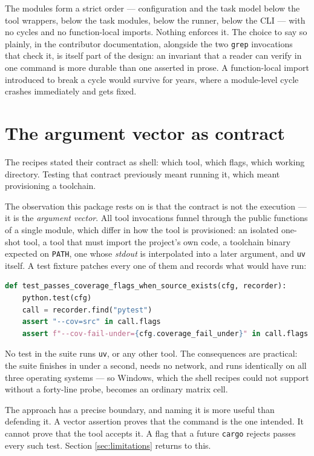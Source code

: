 \documentclass[11pt,a4paper]{article}
\begin{document}
The modules form a strict order --- configuration and the task model below the tool
wrappers, below the task modules, below the runner, below the CLI --- with no cycles and no
function-local imports. Nothing enforces it. The choice to say so plainly, in the
contributor documentation, alongside the two \texttt{grep} invocations that check it, is
itself part of the design: an invariant that a reader can verify in one command is more
durable than one asserted in prose. A function-local import introduced to break a cycle
would survive for years, where a module-level cycle crashes immediately and gets fixed.

\section{The argument vector as contract}
\label{sec:testing}

The recipes stated their contract as shell: which tool, which flags, which working
directory. Testing that contract previously meant running it, which meant provisioning a
toolchain.

The observation this package rests on is that the contract is not the execution --- it is
the \emph{argument vector}. All tool invocations funnel through the public functions of a
single module, which differ in how the tool is provisioned: an isolated one-shot tool, a tool
that must import the project's own code, a toolchain binary expected on \texttt{PATH}, one
whose \emph{stdout} is interpolated into a later argument, and \texttt{uv} itself. A test
fixture patches every one of them and records what would have run:

\begin{lstlisting}[language=Python]
def test_passes_coverage_flags_when_source_exists(cfg, recorder):
    python.test(cfg)
    call = recorder.find("pytest")
    assert "--cov=src" in call.flags
    assert f"--cov-fail-under={cfg.coverage_fail_under}" in call.flags
\end{lstlisting}

No test in the suite runs \texttt{uv}, or any other tool. The consequences are practical:
the suite finishes in under a second, needs no network, and runs identically on all three
operating systems --- so Windows, which the shell recipes could not support without a
forty-line probe, becomes an ordinary matrix cell.

The approach has a precise boundary, and naming it is more useful than defending it. A
vector assertion proves that the command is the one intended. It cannot prove that the tool
accepts it. A flag that a future \texttt{cargo} rejects passes every such test. Section
\ref{sec:limitations} returns to this.
\end{document}
